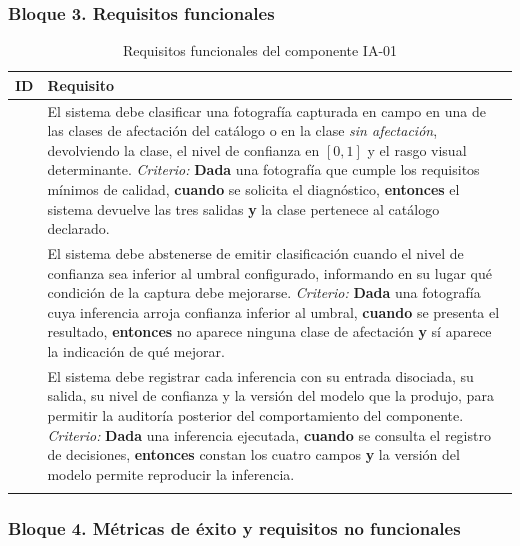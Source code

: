 \subsubsection*{Bloque 3. Requisitos funcionales}

\begin{longtable}{|C{2.1cm}|L{13.3cm}|}
\hline
{}\textbf{ID} & \textbf{Requisito}\\ \hline
\endhead
{} & El sistema debe clasificar una fotografía capturada en campo en una de las clases de afectación del catálogo o en la clase \emph{sin afectación}, devolviendo la clase, el nivel de confianza en $[0,1]$ y el rasgo visual determinante. \newline \emph{Criterio:} \textbf{Dada} una fotografía que cumple los requisitos mínimos de calidad, \textbf{cuando} se solicita el diagnóstico, \textbf{entonces} el sistema devuelve las tres salidas \textbf{y} la clase pertenece al catálogo declarado. \\ \hline
{} & El sistema debe abstenerse de emitir clasificación cuando el nivel de confianza sea inferior al umbral configurado, informando en su lugar qué condición de la captura debe mejorarse. \newline \emph{Criterio:} \textbf{Dada} una fotografía cuya inferencia arroja confianza inferior al umbral, \textbf{cuando} se presenta el resultado, \textbf{entonces} no aparece ninguna clase de afectación \textbf{y} sí aparece la indicación de qué mejorar. \\ \hline
{} & El sistema debe registrar cada inferencia con su entrada disociada, su salida, su nivel de confianza y la versión del modelo que la produjo, para permitir la auditoría posterior del comportamiento del componente. \newline \emph{Criterio:} \textbf{Dada} una inferencia ejecutada, \textbf{cuando} se consulta el registro de decisiones, \textbf{entonces} constan los cuatro campos \textbf{y} la versión del modelo permite reproducir la inferencia. \\ \hline
\caption{Requisitos funcionales del componente IA-01}
\end{longtable}

\subsubsection*{Bloque 4. Métricas de éxito y requisitos no funcionales}

